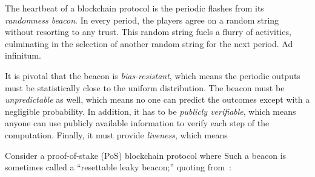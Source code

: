 
The heartbeat of a blockchain protocol is the periodic flashes from its \emph{randomness beacon}. 
In every period, the players agree on a random string without resorting to any trust. 
This random string fuels a flurry of activities, 
culminating in the selection of another random string for the next period. Ad infinitum. 

It is pivotal that the beacon is \emph{bias-resistant}, 
which means the periodic outputs must be statistically close to the uniform distribution. 
The beacon must be \emph{unpredictable} as well, which means no one can predict the outcomes except with a negligible probability. 
In addition, it has to be \emph{publicly verifiable}, 
which means anyone can use publicly available information to verify each step of the computation. 
Finally, it must provide \emph{liveness}, which means 

Consider a proof-of-stake (PoS) blockchain protocol 
where 
Such a beacon is sometimes called a ``resettable leaky beacon;'' 
quoting from~\citet{Praos}:



